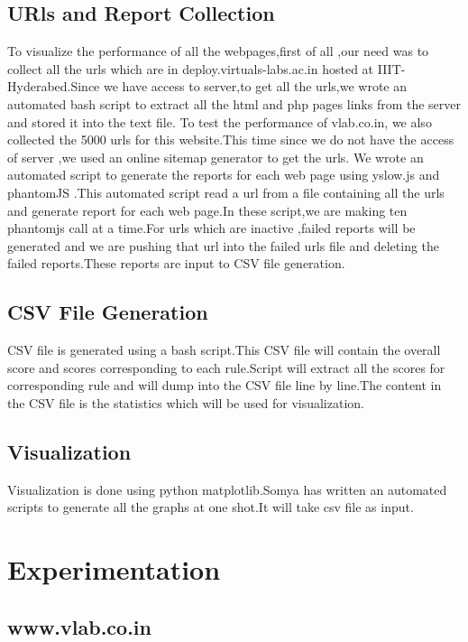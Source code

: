 \documentclass[11pt]{article}
\begin{document}
\subsection{URls and Report Collection}
\label{sec-4.1}


To visualize the performance of all the webpages,first of all ,our need was to collect all the urls which are in deploy.virtuals-labs.ac.in hosted at IIIT-Hyderabed.Since we have access to server,to get all the urls,we wrote an automated bash script to extract all the html and php pages links from the server and stored it into the text file.
To test the performance of vlab.co.in, we also collected the 5000 urls for this website.This time since we do not have the access of server ,we used an online sitemap generator to get the urls.
We wrote an automated script to generate the reports for each web page using yslow.js and phantomJS .This automated script read a url from a file containing all the urls and generate report for each web page.In these script,we are making ten phantomjs  call at a time.For urls which are inactive ,failed reports will be generated and we are pushing that url into the failed urls file and deleting the failed reports.These reports are input to CSV file generation.

\subsection{CSV File Generation}
\label{sec-4.2}

CSV file is generated using a bash script.This CSV file will contain the overall score and scores corresponding to each rule.Script will extract all the scores for corresponding rule and will dump into the  CSV file  line by line.The content in the CSV file is the statistics which will be used for visualization.

\subsection{Visualization}
\label{sec-4.3}

Visualization is done using python matplotlib.Somya has written an automated scripts to generate all the graphs at one shot.It will take csv file as input.

\section{Experimentation}
\label{sec-5}

\subsection{www.vlab.co.in}
\label{sec-5.1}
\end{document}
